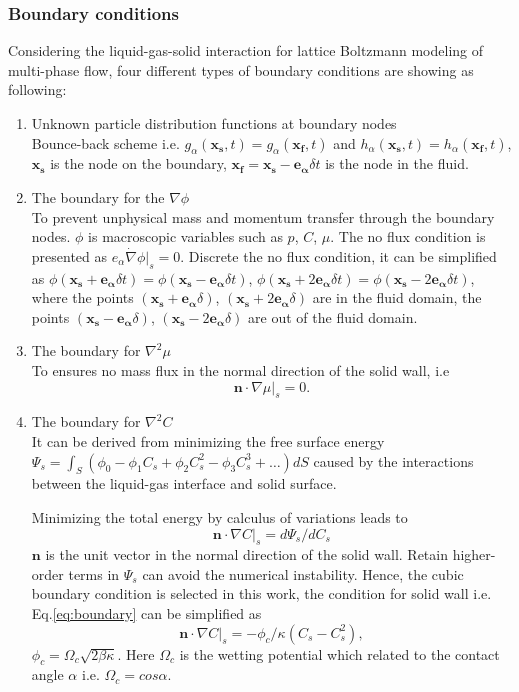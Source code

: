 \documentclass[10pt]{elsarticle}
\begin{document}
\subsubsection{Boundary conditions}
\label{sec:boundary}
Considering the liquid-gas-solid interaction for lattice Boltzmann modeling of multi-phase flow, four different types of boundary conditions are showing as following:
\begin{enumerate}
 \item Unknown particle distribution functions at boundary nodes\\
Bounce-back scheme i.e. $g_\alpha(\mathbf{x_s},t)=g_\alpha(\mathbf{x_f},t)$ and $h_\alpha(\mathbf{x_s},t)=h_\alpha(\mathbf{x_f},t)$, $\mathbf{x_s}$ is the node on the boundary, $\mathbf{x_f}=\mathbf{x_s}-\mathbf{e_\alpha}\delta t$ is the node in the fluid.
\item The boundary for the $\nabla\phi$\\
To prevent unphysical mass and momentum transfer through the boundary nodes. $\phi$ is macroscopic variables such as $p$, $C$, $\mu$. The no flux condition is presented as $e_\alpha\dot\nabla\phi|_s=0$.  Discrete the no flux condition, it can be simplified as $\phi(\mathbf{x_s}+\mathbf{e_\alpha}\delta t)=\phi(\mathbf{x_s}-\mathbf{e_\alpha}\delta t)$,  $\phi(\mathbf{x_s}+2\mathbf{e_\alpha}\delta t)=\phi(\mathbf{x_s}-2\mathbf{e_\alpha}\delta t)$, where the points $(\mathbf{x_s}+\mathbf{e_\alpha}\delta)$, $(\mathbf{x_s}+2\mathbf{e_\alpha}\delta)$ are in the fluid domain, the points $(\mathbf{x_s}-\mathbf{e_\alpha}\delta)$, $(\mathbf{x_s}-2\mathbf{e_\alpha}\delta)$ are out of the fluid domain.
\item The boundary for $\nabla^2 \mu$\\
To ensures no mass flux in the normal direction of the solid wall, i.e
\begin{equation}
\mathbf{n}\cdot\nabla\mu|_s=0.
\label{eq:potential}
\end{equation}
\item The boundary for $\nabla^2 C$\\
It can be derived from minimizing the free surface energy $\Psi_s=\int_S(\phi_0-\phi_1C_s+\phi_2C_s^2-\phi_3C_s^3+\ldots)dS  $ caused by the interactions between the liquid-gas interface and solid surface.

Minimizing the total energy  by calculus of variations\cite{rf:Yang07} leads to
\begin{equation}
\mathbf{n}\cdot\nabla C|_s=d\Psi_s/dC_s
\label{eq:boundary}
\end{equation}
$\mathbf{n}$ is the unit vector in the normal direction of the solid wall. Retain higher-order terms in $\Psi_s$ can avoid the numerical instability. Hence, the cubic boundary condition is selected\cite{rf:Liu09} in this work, the condition for solid wall i.e. Eq.\ref{eq:boundary} can be simplified as
\begin{equation}
\mathbf{n}\cdot\nabla C|_s=-\phi_c/\kappa(C_s-C_s^2),
\label{eq:boundaryC}
\end{equation}
$\phi_c=\Omega_c\sqrt{2\beta\kappa}$. Here $\Omega_c$ is the wetting potential which related to the contact angle $\alpha$ i.e. $\Omega_c=cos\alpha$.
\end{enumerate}
\end{document}
